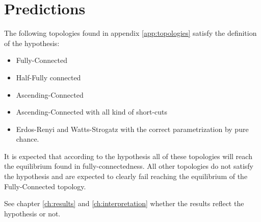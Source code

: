 \documentclass[Bachelorarbeit.tex]{subfiles}
\begin{document}
\section{Predictions}
The following topologies found in appendix \ref{app:topologies} satisfy the definition of the hypothesis:
 
\begin{itemize}
\item Fully-Connected
\item Half-Fully connected
\item Ascending-Connected
\item Ascending-Connected with all kind of short-cuts
\item Erdos-Renyi and Watts-Strogatz with the correct parametrization by pure chance.
\end{itemize}

It is expected that according to the hypothesis all of these topologies will reach the equilibrium found in fully-connectedness. All other topologies do not satisfy the hypothesis and are expected to clearly fail reaching the equilibrium of the Fully-Connected topology.

\medskip

See chapter \ref{ch:results} and \ref{ch:interpretation} whether the results reflect the hypothesis or not. 
\end{document}
